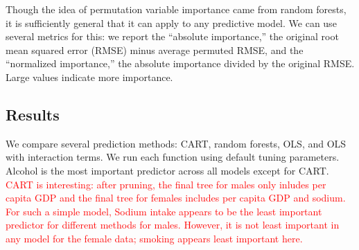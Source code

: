 \documentclass[11pt]{article}\usepackage[]{graphicx}\usepackage[]{color}
\begin{document}
Though the idea of permutation variable importance came from random forests, it is sufficiently general that it can apply to any predictive model. 
We can use several metrics for this: 
we report the ``absolute importance,'' the original root mean squared error (RMSE) minus average permuted RMSE, and the ``normalized importance,'' the absolute importance divided by the original RMSE. 
Large values indicate more importance.

\subsection{Results}
We compare several prediction methods: CART, random forests, OLS, and OLS with interaction terms.
We run each function using default tuning parameters.
Alcohol is the most important predictor across all models except for CART.
\textcolor{red}{CART is interesting: after pruning, the final tree for males only inludes per capita GDP and the final tree for females includes per capita GDP and sodium.
For such a simple model, 
Sodium intake appears to be the least important predictor for different methods for males. 
However, it is not least important in any model for the female data; smoking appears least important here.
}
\end{document}
